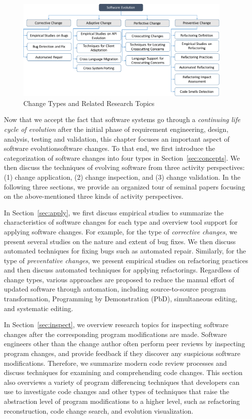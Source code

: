 \begin{figure}[ht]
 \centering
 \includegraphics[width=0.95\textwidth]{images/ChangeTypesTopics.pdf}
 \caption{Change Types and Related Research Topics} 
 \label{fig:changetypetopic}
\end{figure}

Now that we accept the fact that software systems go through a {\em continuing life cycle of evolution} after the initial phase of requirement engineering, design, analysis, testing and validation, this chapter focuses an important aspect of software evolution\textemdash software changes. To that end, we first introduce the categorization of software changes into four types in Section~\ref{sec:concepts}. We then discuss the techniques of evolving software from three activity perspectives: (1) change application, (2) change inspection, and (3) change validation. In the following three sections, we provide an organized tour of seminal papers focusing on the above-mentioned three kinds of activity perspectives. 

In Section~\ref{sec:apply}, we first discuss empirical studies to summarize the characteristics of software changes for each type and overview tool support for applying software changes. For example, for the type of {\em corrective changes}, we present several studies on the nature and extent of bug fixes. We then discuss automated techniques for fixing bugs such as automated repair. Similarly, for the type of {\em preventative changes}, we present empirical studies on refactoring practices and then discuss automated techniques for applying refactorings.  Regardless of change types, various approaches are proposed to reduce the manual effort of updated software through automation, including source-to-source program transformation, Programming by Demonstration (PbD), simultaneous editing, and systematic editing.

In Section~\ref{sec:inspect}, we overview research topics for inspecting software changes after the corresponding program modifications are made. Software engineers other than the change author often perform peer reviews by inspecting program changes, and provide feedback if they discover any suspicious software modifications. Therefore, we summarize modern code review processes and discuss techniques for examining and comprehending code changes. This section also overviews a variety of program differencing techniques that developers can use to investigate code changes and other types of techniques that raise the abstraction level of program modifications to a higher level, such as refactoring reconstruction, code change search, and evolution visualization. 

